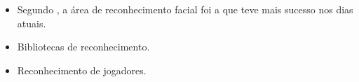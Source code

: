 \begin{itemize}
    \item<1> Segundo , a área de reconhecimento facial foi a que teve mais sucesso nos dias atuais.
    \item<1> Bibliotecas de reconhecimento.
    \item<1> Reconhecimento de jogadores.
\end{itemize}